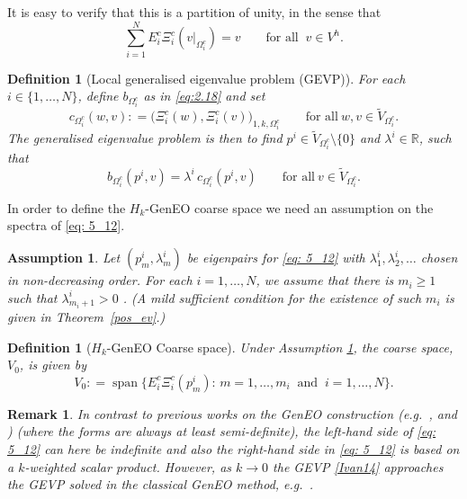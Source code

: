 \documentclass[numbers,webpdf,imaiai]{ima-authoring-template}%
\theoremstyle{thmstyletwo}%
\newtheorem{assumption}[theorem]{Assumption}%
\newtheorem{definition}[theorem]{Definition}
\newtheorem{remark}[theorem]{Remark}
\numberwithin{equation}{section}
\newcommand{\assign}{\mathrel{\mathop:}=}
\numberwithin{equation}{section}
\DeclareMathOperator{\linspan}{span}
\renewcommand{\kappa}{k}
\begin{document}
{\noindent 
It is easy to verify that this is a partition of unity, in the sense that 
\begin{equation}\label{partition_of_unity}
	\sum_{i = 1}^N E_i^{c} \Xi_i^{c}({v|_{\Omega_i^c}}) = v \qquad \text{for all}  \;\; v \in V^h. 
\end{equation}

\begin{definition}[Local generalised eigenvalue problem (GEVP)] \label{defH_GenEO}
For each $i\in\{1,\ldots,N\}$, define $b_{\Omega_i^c}$ as in \eqref{eq:2.18} and set
\begin{equation} \label{Ivan14}  
	c_{\Omega_i^c}(w,v) \assign \bigl(\Xi_i^c(w),\Xi_i^c(v)\bigr)_{1,\kappa,\Omega_i^c} 
    \qquad \text{for all} \ w,v \in \widetilde{V}_{\Omega_i^c}.
\end{equation}  
The generalised eigenvalue problem is then to  
find $p^i\in \widetilde{V}_{\Omega_i^c}  \setminus\{0\}$ and $\lambda^i\in\mathbb{R}$, such that
\begin{equation}\label{eq: 5_12} 
	b_{\Omega_i^c}(p^i,v) = \lambda^i \, c_{\Omega_i^c} (p^i, v)  \qquad 
	\text{for all} \ v\in\widetilde{V}_{\Omega_i^c}. 
\end{equation}
\end{definition}

In order to define the $H_k$-GenEO coarse space we need an assumption on the spectra of \eqref{eq: 5_12}.

\begin{assumption} \label{ass:further} 
Let $(p^i_m,\lambda^i_m)$ be eigenpairs for \eqref{eq: 5_12} with $\lambda_1^i, \lambda_2^i, \ldots $ chosen in
non-decreasing order. 
For each  $i= 1,\ldots,N$,  we assume that there is $m_i\geq 1 $ such that $\lambda_{m_i+1}^i>0$ .
(A mild sufficient condition for the existence of such  $m_i$ is given in Theorem~\ref{pos_ev}.)
\end{assumption}

\begin{definition}[$H_\kappa$-GenEO Coarse space] \label{def: 5_1}
Under Assumption \ref{ass:further}, the coarse space, $V_0$, is given by 
\begin{equation}
	V_0 \assign \linspan \bigl\{E_i^c\Xi_i^c(p^i_m): \,  m = 1, \ldots, m_i\;\; \text{and} \;\; i = 1, \ldots, N\bigr\}.
\end{equation}
\end{definition}

\begin{remark}
In contrast to previous works on the GenEO construction (e.g.\ \cite{Spillane:2014:ARC},  \cite{Bootland:2022:OSM} and \cite{Bastian:2021:MSD}) 
(where the forms are always at least semi-definite), the left-hand side of \eqref{eq: 5_12} can here  be indefinite and also  
the right-hand side in \eqref{eq:  5_12}
is based on a $k$-weighted scalar product. 
However, as $k \rightarrow 0$ the GEVP  \eqref{Ivan14} approaches the GEVP solved in the classical GenEO method, e.g.\ \cite{Spillane:2014:ARC}.
\end{remark}

}
\end{document}
